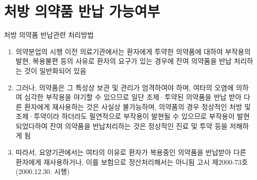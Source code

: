 ﻿\section{처방 의약품 반납 가능여부}

\begin{commentbox}{처방 의약품 반납관련 처리방법}
\begin{enumerate}[1.]\tightlist
\item 의약분업의 시행 이전 의료기관에서는 환자에게 투약한 의약품에 대하여 부작용의 발현, 복용불편 등의 사유로 환자의 요구가 있는 경우에 잔여 의약품을 반납 처리하는 것이 일반화되어 있음
\item 그러나, 의약품은 그 특성상 보관 및 관리가 엄격하여야 하며, 여타의 오염에 의하여 심각한 부작용을 야기할 수 있으므로 일단 조제·투약된 의약품을 반납 받아 다른 환자에게 재사용하는 것은 사실상 불가능하며, 의약품의 경우 정상적인 처방 및 조제·투약이라 하더라도 필연적으로 부작용이 발현될 수 있으므로 부작용이 발현되었다하여 잔여 의약품을 반납처리하는 것은 정상적인 진료 및 투약 등을 저해하게 됨
\item 따라서, 요양기관에서는 여타의 이유로 환자가 복용중인 의약품을 반납받아 다른 환자에게 재사용하거나, 이를 보험으로 정산처리해서는 아니됨 고시 제2000-73호 (2000.12.30. 시행)
\end{enumerate}
\end{commentbox}

